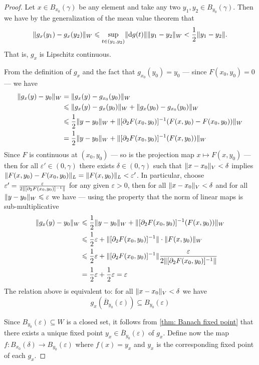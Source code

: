 \begin{proof}
Let \(x \in B_{x_0}(\gamma)\) be any element and take any two \(y_1, y_2 \in
B_{y_0}(\gamma)\). Then we have by the generalization of the mean value theorem
that
\[
  \lVert g_x(y_1) - g_x(y_{2})\rVert_{W} \leqslant \sup_{t \in (y_1, y_2)} \lVert\mathrm{d} g(t)\rVert
  \lVert y_1 - y_2\rVert_W < \frac{1}{2} \lVert y_1 - y_2\rVert.
\]
That is, \(g_x\) is Lipschitz continuous.

From the definition of \(g_x\) and the fact that \(g_{x_0}(y_0) = y_0\) ---
since \(F(x_0, y_0) = 0\) --- we have
\begin{align*}
  \lVert g_x(y) - y_0\rVert_W
  &= \lVert g_x(y) - g_{x_0}(y_0)\rVert_W \\
  &\leqslant \lVert g_x(y) - g_{x}(y_0)\rVert_W + \lVert g_x(y_0) - g_{x_0}(y_0)\rVert_W \\
  &\leqslant \frac{1}{2} \lVert y - y_0\rVert_W + \lVert[\partial_2F(x_0, y_0)]^{-1}(F(x, y_0) -
    F(x_0, y_0))\rVert_W \\
  &= \frac{1}{2} \lVert y - y_0\rVert_W
    + \lVert[\partial_{2}F(x_{0}, y_{0})]^{-1}(F(x, y_0))\rVert_W
\end{align*}
Since \(F\) is continuous at \((x_{0}, y_0)\) --- so is the projection
map \(x \mapsto F(x, y_0)\) --- then for all \(\varepsilon' \in (0, \gamma)\) there
exists \(\delta \in (0, \gamma)\) such that \(\lVert x - x_0\rVert_V < \delta\) implies \(\lVert F(x, y_0) -
  F(x_0, y_0)\rVert_L = \lVert F(x, y_0)\rVert_L < \varepsilon'\). In particular, choose \(\varepsilon' =
\frac{\varepsilon}{2 \lVert[\partial_{2}F(x_0, y_0)]^{-1}\rVert}\) for any given \(\varepsilon > 0\), then for
all \(\lVert x - x_0\rVert_V < \delta\) and for all \(\lVert y - y_0\rVert_W \leqslant \varepsilon\) we have --- using
the property that the norm of linear maps is sub-multiplicative
\begin{align*}
  \lVert g_x(y) - y_0\rVert_{W}
  &\leqslant \frac{1}{2} \lVert y - y_0\rVert_{W} + \lVert[\partial_2F(x_0, y_0)]^{-1}(F(x, y_0))\rVert_W
  \\
  &\leqslant \frac{1}{2} \varepsilon + \lVert[\partial_2F(x_0, y_0)]^{-1}\rVert \cdot \lVert F(x, y_0)\rVert_W
  \\
  &\leqslant \frac{1}{2}\varepsilon
    + \lVert[\partial_2F(x_0, y_0)]^{-1}\rVert \frac{\varepsilon}{2 \lVert[\partial_2F(x_0, y_0)]^{-1}\rVert}
  \\
  &= \frac{1}{2} \varepsilon + \frac{1}{2}\varepsilon = \varepsilon
\end{align*}
The relation above is equivalent to: for all \(\lVert x - x_0\rVert_V < \delta\) we have
\[
  g_x(\overline{B}_{y_0}(\varepsilon)) \subseteq B_{y_0}(\varepsilon)
\]

Since \(B_{y_0}(\varepsilon) \subseteq W\) is a closed set, it follows from
\cref{thm: Banach fixed point} that there exists a unique fixed point \(y_x
\in \overline{B}_{y_0}(\varepsilon)\) of \(g_{x}\). Define now the map \(f: B_{x_0}(\delta) \to
B_{y_0}(\varepsilon)\) where \(f(x) = y_{x}\) and \(y_x\) is the corresponding fixed
point of each \(g_x\).


\end{proof}
